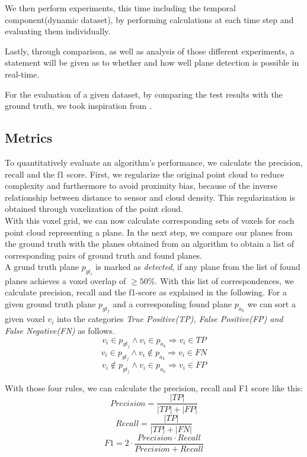 \documentclass[main.tex]{subfiles}
\begin{document}
We then perform experiments, this time including the temporal component(dynamic dataset), by performing calculations at each time step and evaluating them individually.

Lastly, through comparison, as well as analysis of those different experiments, a statement will be given as to whether and how well plane detection is
possible in real-time.

For the evaluation of a given dataset, by comparing the test results with the ground truth, we took inspiration from \citeauthor{Araújo_Oliveira_2020} \cite[Section~4]{Araújo_Oliveira_2020}.


\subsection{Metrics}
To quantitatively evaluate an algorithm's performance, we calculate the precision, recall and the f1 score.
First, we regularize the original point cloud to reduce complexity and furthermore to avoid proximity bias, because of the inverse relationship
between distance to sensor and cloud density. This regularization is obtained through voxelization of the point cloud.\\
With this voxel grid, we can now calculate corresponding sets of voxels for each point cloud representing a plane.
In the next step, we compare our planes from the ground truth with the planes obtained from an algorithm to obtain a list of corresponding pairs
of ground truth and found planes.\\
A grund truth plane $p_{gt_i}$ is marked as \textit{detected}, if any plane from the list of found planes achieves a voxel overlap of $\geq 50\%$.
With this list of correspondences, we calculate precision, recall and the f1-score as explained in the following.
For a given ground truth plane $p_{gt_j}$ and a corresponding found plane $p_{a_k}$ we can sort a given voxel $v_i$ into the categories
\textit{True Positive(TP), False Positive(FP) and False Negative(FN)} as follows.
$$v_i \in p_{gt_j} \land v_i \in p_{a_k} \Rightarrow v_{i} \in TP$$
$$v_i \in p_{gt_j} \land v_i \notin p_{a_k} \Rightarrow v_{i} \in FN$$
$$v_i \notin p_{gt_j} \land v_i \in p_{a_k} \Rightarrow v_{i} \in FP$$

With those four rules, we can calculate the precision, recall and F1 score like this:
$$Precision = \frac{|TP|}{|TP|+|FP|}$$
$$Recall = \frac{|TP|}{|TP|+|FN|}$$
$$F1 = 2 \cdot\frac{Precision\cdot Recall}{Precision + Recall}$$
\end{document}
